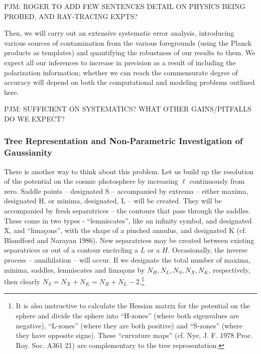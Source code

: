 \documentclass[psfig,11pt]{article}
\begin{document}
PJM: ROGER TO ADD FEW SENTENCES DETAIL ON PHYSICS BEING PROBED, AND RAY-TRACING EXPTS?

Then, we will carry out an extensive systematic error analysis, introducing various sources of contamination from the various foregrounds (using the Planck products as templates) and quantifying the robustness of our results to them. We expect all our inferences to increase in precision as a result of including the polarization information; whether we can reach the commensurate degree of accuracy will depend on both the computational and modeling problems outlined here.

PJM: SUFFICIENT ON SYSTEMATICS? WHAT OTHER GAINS/PITFALLS DO WE EXPECT?


\subsubsection{Tree Representation and Non-Parametric Investigation of Gaussianity}

There is another way to think about this problem. Let us build up the resolution of the potential on the cosmic photosphere by increasing $\ell$ continuously from zero. Saddle points -- designated  S -- accompanied by extrema -- either maxima, designated H,  or minima, designated, L -- will be created. They will be accompanied by fresh separatrices -- the contours that pass through the saddles. These come in two types - ``lemniscates'', like an infinity symbol, and designated X, and ``lima\c cons'', with the shape of a pinched annulus, and designated K (cf. Blandford and Narayan 1986). New separatrices may be created between existing separatrices or out of a contour encircling a $L$ or a $H$.  Occasionally, the inverse process -- annihilation -- will occur. If we designate the total number of maxima, minima, saddles, lemniscates and lima\c cons by $N_H,N_L,N_S,N_X,N_K$, respectively, then clearly $N_S=N_X+N_K=N_H+N_L-2$.\footnote{It is also instructive to calculate the Hessian matrix for the potential on the sphere and divide the sphere into ``H-zones'' (where both eigenvalues are negative), ``L-zones'' (where they are both positive) and ``S-zones'' (where they have opposite signs). These ``curvature maps'' (cf. Nye, J. F. 1978 Proc. Roy. Soc. A361 21) are complementary to the tree representation.}
\end{document}

